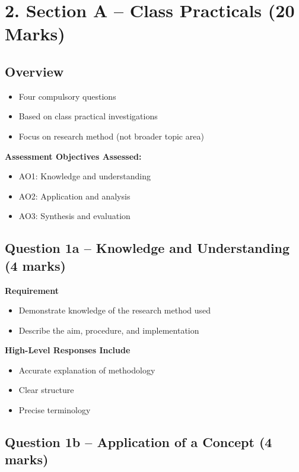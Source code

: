 \documentclass[12pt,a4paper]{article}
\begin{document}
\section*{2. Section A – Class Practicals (20 Marks)}

\subsection*{Overview}

\begin{itemize}
    \item Four compulsory questions
    \item Based on class practical investigations
    \item Focus on research method (not broader topic area)
\end{itemize}

\textbf{Assessment Objectives Assessed:}
\begin{itemize}
    \item AO1: Knowledge and understanding
    \item AO2: Application and analysis
    \item AO3: Synthesis and evaluation
\end{itemize}

\subsection*{Question 1a – Knowledge and Understanding (4 marks)}

\textbf{Requirement}
\begin{itemize}
    \item Demonstrate knowledge of the research method used
    \item Describe the aim, procedure, and implementation
\end{itemize}

\textbf{High-Level Responses Include}
\begin{itemize}
    \item Accurate explanation of methodology
    \item Clear structure
    \item Precise terminology
\end{itemize}

\subsection*{Question 1b – Application of a Concept (4 marks)}
\end{document}
